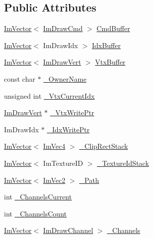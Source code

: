 \subsection*{Public Attributes}
\begin{DoxyCompactItemize}
\item 
\hyperlink{class_im_vector}{Im\+Vector}$<$ \hyperlink{struct_im_draw_cmd}{Im\+Draw\+Cmd} $>$ \hyperlink{struct_im_draw_list_a67a4b5cc4c83bc3b81d96c46cbd38a07}{Cmd\+Buffer}
\item 
\hyperlink{class_im_vector}{Im\+Vector}$<$ Im\+Draw\+Idx $>$ \hyperlink{struct_im_draw_list_adf292ff70a954d82daf061c609e75dfc}{Idx\+Buffer}
\item 
\hyperlink{class_im_vector}{Im\+Vector}$<$ \hyperlink{struct_im_draw_vert}{Im\+Draw\+Vert} $>$ \hyperlink{struct_im_draw_list_aa8ff4aee39cf3c3791b7e29a7b4264be}{Vtx\+Buffer}
\item 
const char $\ast$ \hyperlink{struct_im_draw_list_a643f385fb9d5fc35a431e72a10a212f5}{\+\_\+\+Owner\+Name}
\item 
unsigned int \hyperlink{struct_im_draw_list_a2228793183665bc3d8612795555fe505}{\+\_\+\+Vtx\+Current\+Idx}
\item 
\hyperlink{struct_im_draw_vert}{Im\+Draw\+Vert} $\ast$ \hyperlink{struct_im_draw_list_a67f870f5140bf1cab14b8515b7386073}{\+\_\+\+Vtx\+Write\+Ptr}
\item 
Im\+Draw\+Idx $\ast$ \hyperlink{struct_im_draw_list_a771f4c7f71873852fe030c3e498e5843}{\+\_\+\+Idx\+Write\+Ptr}
\item 
\hyperlink{class_im_vector}{Im\+Vector}$<$ \hyperlink{struct_im_vec4}{Im\+Vec4} $>$ \hyperlink{struct_im_draw_list_ae950024f053f3c94dc2c763d20be609d}{\+\_\+\+Clip\+Rect\+Stack}
\item 
\hyperlink{class_im_vector}{Im\+Vector}$<$ Im\+Texture\+ID $>$ \hyperlink{struct_im_draw_list_a848faddd121da050214b8d8159e5e704}{\+\_\+\+Texture\+Id\+Stack}
\item 
\hyperlink{class_im_vector}{Im\+Vector}$<$ \hyperlink{struct_im_vec2}{Im\+Vec2} $>$ \hyperlink{struct_im_draw_list_a5bdc39abf351360500048628b8dc1b07}{\+\_\+\+Path}
\item 
int \hyperlink{struct_im_draw_list_a143ff30108f3dca8c28c7925e23d358b}{\+\_\+\+Channels\+Current}
\item 
int \hyperlink{struct_im_draw_list_ae3854c12dbac41400f4acb65192f5015}{\+\_\+\+Channels\+Count}
\item 
\hyperlink{class_im_vector}{Im\+Vector}$<$ \hyperlink{struct_im_draw_channel}{Im\+Draw\+Channel} $>$ \hyperlink{struct_im_draw_list_ae6be941728e5b2c81a03c78e4aa22629}{\+\_\+\+Channels}
\end{DoxyCompactItemize}


